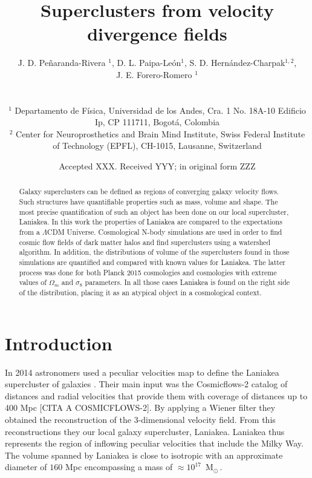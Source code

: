 \documentclass[usenatbib]{mnras}
\title[Superclusters from velocity divergence fields]{Superclusters from velocity divergence fields}
\author[Pe\~naranda-Rivera et al.]{
\parbox[t]{\textwidth}{
    {J. D. Pe\~naranda-Rivera $^1$,} 
    {D. L. Paipa-Le\'on$^{1}$,}
    {S. D. Hern\'andez-Charpak$^{1,2}$,}\\
    {J. E. Forero-Romero $^{1}$}
}
\\\\
$^{1}$ Departamento de F\'isica, Universidad de los Andes, Cra. 1
  No. 18A-10 Edificio Ip, CP 111711, Bogot\'a, Colombia \\
$^{2}$ Center for Neuroprosthetics and Brain Mind Institute, Swiss
  Federal Institute of Technology (EPFL), CH-1015, Lausanne,
  Switzerland\\  
}
\date{Accepted XXX. Received YYY; in original form ZZZ}
\newcommand{\Msun}{\,{\rm M}$_{\odot}$\,}
\begin{document}
\label{firstpage}
\pagerange{\pageref{firstpage}--\pageref{lastpage}}
\maketitle

\maketitle
\begin{abstract}
Galaxy superclusters can be defined as regions of converging galaxy
velocity flows. Such structures have quantifiable properties such as
mass, volume and shape. The most precise quantification of such an
object has been done on our local supercluster, Laniakea. In this work
the properties of Laniakea are compared to the expectations from a
$\Lambda$CDM Universe. Cosmological N-body simulations are used in
order to find cosmic flow fields of dark matter halos and find
superclusters using a watershed algorithm. In addition, the
distributions of volume of the superclusters found in those
simulations are quantified and compared with known values for
Laniakea. The latter process was done for both Planck 2015 cosmologies
and cosmologies with extreme values of $\Omega_m$ and $\sigma_8$
parameters. In all those cases Laniakea is found on the right side of
the distribution, placing it as an atypical object in a cosmological
context.  
\end{abstract}

\begin{keywords}
\end{keywords}




\section{Introduction}


In 2014 astronomers used a peculiar velocities map  to 
define the Laniakea supercluster of galaxies
\citep{2014Natur.513...71T}.  
Their main input was the Cosmicflows-2 catalog of distances and radial
velocities that provide them with coverage of distances up to 400 Mpc
[CITA A COSMICFLOWS-2]. 
By applying a Wiener filter \citep{Zaroubi_1999} they obtained the
reconstruction of the 3-dimensional velocity field. 
From this reconstructions they our local galaxy supercluster, Laniakea.
Laniakea thus represents the region of inflowing peculiar velocities
that include the Milky Way. 
The volume spanned by Laniakea is close to isotropic with an 
approximate diameter of $160$ Mpc encompassing a mass of
$\approx 10^{17}$ \Msun.
\end{document}
